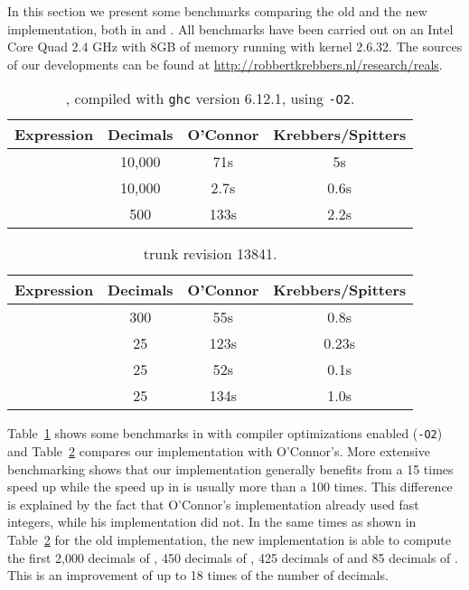 \documentclass[a4paper,10pt,runningheads]{llncs}
\begin{document}
In this section we present some benchmarks comparing the old and the new implementation, both in \Haskell{} and \Coq. All benchmarks have been carried out on an Intel Core Quad 2.4 GHz with 8GB of memory running \DebianFull{} with kernel 2.6.32. The sources of our developments can be found at \url{http://robbertkrebbers.nl/research/reals}. 

\begin{table}[tp]
\centering
\begin{tabular}{|c|c|c|c|}
\hline
Expression & \quad Decimals \quad  & \quad O'Connor \quad & \quad  Krebbers/Spitters \quad  \\
\hline
 & 10,000 & 71s & 5s\\ & 10,000 & 2.7s & 0.6s\\ & 500 & 133s & 2.2s\\\hline
\end{tabular}
\caption{\Haskell{}, compiled with \texttt{ghc} version 6.12.1, using \texttt{-O2}.}
\label{table:haskellO2}
\end{table}

\begin{table}[tp]
\centering
\begin{tabular}{|c|c|c|c|}
\hline
Expression & \quad Decimals \quad  & \quad O'Connor \quad & \quad  Krebbers/Spitters \quad  \\
\hline
 & 300 & 55s & 0.8s\\ & 25 & 123s & 0.23s\\ & 25 & 52s & 0.1s\\ & 25 & 134s & 1.0s\\\hline
\end{tabular}
\caption{\Coq{} trunk revision 13841.}
\label{table:coq}
\end{table}

Table~\ref{table:haskellO2} shows some benchmarks in \Haskell{} with compiler optimizations enabled (\texttt{-O2}) and Table~\ref{table:coq} compares our \Coq{} implementation with O'Connor's. More extensive benchmarking shows that our \Haskell{} implementation generally benefits from a 15 times speed up while the speed up in \Coq{} is usually more than a 100 times. This difference is explained by the fact that O'Connor's \Haskell{} implementation already used fast integers, while his \Coq{} implementation did not. In the same times as shown in Table~\ref{table:coq} for the old implementation, the new implementation is able to compute the first 2,000 decimals of , 450 decimals of , 425 decimals of  and 85 decimals of . This is an improvement of up to 18 times of the number of decimals.
\end{document}
